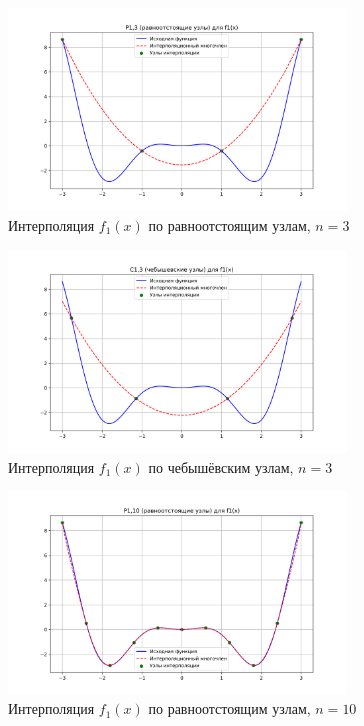 \documentclass[12pt]{article}
\begin{document}
\begin{figure}[H]
    \centering
    \includegraphics[width=0.8\textwidth]{P1_3.png}
    \caption{Интерполяция $f_1(x)$ по равноотстоящим узлам, $n=3$}
\end{figure}

\begin{figure}[H]
    \centering
    \includegraphics[width=0.8\textwidth]{C1_3.png}
    \caption{Интерполяция $f_1(x)$ по чебышёвским узлам, $n=3$}
\end{figure}

\begin{figure}[H]
    \centering
    \includegraphics[width=0.8\textwidth]{P1_10.png}
    \caption{Интерполяция $f_1(x)$ по равноотстоящим узлам, $n=10$}
\end{figure}
\end{document}
